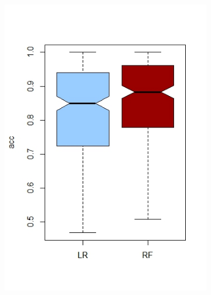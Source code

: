 \documentclass[12pt]{article}
\begin{document}
\begin{figure}[h]
\begin{subfigure}{.5\textwidth}
  \centering
  \includegraphics[width=.8\linewidth]{Images/Results/OverallGGplot.jpeg}


\end{subfigure}
\end{figure}
\end{document}
